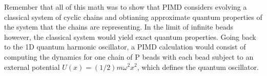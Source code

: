 \documentclass{article}
\begin{document}
Remember that all of this math was to show that PIMD considers evolving a classical system of cyclic chains and obtianing approximate quantum properties of the system that the chains are representing.
In the limit of infinite beads however, the classical system would yield exact quantum properties.
Going back to the 1D quantum harmonic oscillator, a PIMD calculation would consist of computing the dynamics for one chain of P beads with each bead subject to an external potential $U(x) = (1/2)m \omega^2 x^2$, which defines the quantum oscillator.


\end{document}
